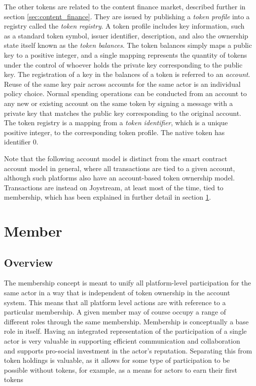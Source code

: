 \documentclass{article}
\begin{document}
The other tokens are related to the content finance market, described further in section \ref{sec:content_finance}. They are issued by publishing a \textit{token profile} into a registry called the \textit{token registry}. A token profile includes key information, such as a standard token symbol, issuer identifier, description, and also the ownership state itself known as the \textit{token balances}. The token balances simply maps a public key to a positive integer, and a single mapping represents the quantity of tokens under the control of whoever holds the private key corresponding to the public key. The registration of a key in the balances of a token is referred to an \textit{account}. Reuse of the same key pair across accounts for the same actor is an individual policy choice. Normal spending operations can be conducted from an account to any new or existing account on the same token by signing a message with a private key that matches the public key corresponding to the original account. The token registry is a mapping from a \textit{token identifier}, which is a unique positive integer, to the corresponding token profile. The native token has identifier $0$.

Note that the following account model is distinct from the smart contract account model in general, where all transactions are tied to a given account, although such platforms also have an account-based token ownership model. Transactions are instead on Joystream, at least most of the time, tied to membership, which has been explained in further detail in section \ref{sec:member}.

\section{Member} \label{sec:member}

\subsection{Overview}

The membership concept is meant to unify all platform-level participation for the same actor in a way that is independent of token ownership in the account system. This means that all platform level actions are with reference to a particular membership. A given member may of course occupy a range of different roles through the same membership. Membership is conceptually a base role in itself. Having an integrated representation of the participation of a single actor is very valuable in supporting efficient communication and collaboration and supports pro-social investment in the actor's reputation. Separating this from token holdings is valuable, as it allows for some type of participation to be possible without tokens, for example, as a means for actors to earn their first tokens
\end{document}
